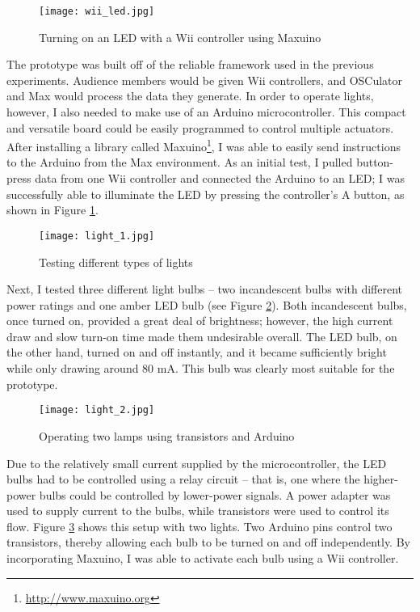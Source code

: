 \begin{figure}
	\centering

	\texttt{[image: wii\_led.jpg]}
	\caption{Turning on an LED with a Wii controller using Maxuino}

	\label{prototyping3.1}
\end{figure}

The prototype was built off of the reliable framework used in the previous experiments. Audience members would be given Wii controllers, and OSCulator and Max would process the data they generate. In order to operate lights, however, I also needed to make use of an Arduino microcontroller. This compact and versatile board could be easily programmed to control multiple actuators. After installing a library called Maxuino\footnote{\url{http://www.maxuino.org}}, I was able to easily send instructions to the Arduino from the Max environment. As an initial test, I pulled button-press data from one Wii controller and connected the Arduino to an LED; I was successfully able to illuminate the LED by pressing the controller's A button, as shown in Figure \ref{prototyping3.1}.

\begin{figure}
	\centering

	\texttt{[image: light\_1.jpg]}
	\caption{Testing different types of lights}

	\label{prototyping3.2}
\end{figure}

Next, I tested three different light bulbs -- two incandescent bulbs with different power ratings and one amber LED bulb (see Figure \ref{prototyping3.2}). Both incandescent bulbs, once turned on, provided a great deal of brightness; however, the high current draw and slow turn-on time made them undesirable overall. The LED bulb, on the other hand, turned on and off instantly, and it became sufficiently bright while only drawing around 80 mA. This bulb was clearly most suitable for the prototype.

\begin{figure}
	\centering

	\texttt{[image: light\_2.jpg]}
	\caption{Operating two lamps using transistors and Arduino}

	\label{prototyping3.3}
\end{figure}

Due to the relatively small current supplied by the microcontroller, the LED bulbs had to be controlled using a relay circuit -- that is, one where the higher-power bulbs could be controlled by lower-power signals. A power adapter was used to supply current to the bulbs, while transistors were used to control its flow. Figure \ref{prototyping3.3} shows this setup with two lights. Two Arduino pins control two transistors, thereby allowing each bulb to be turned on and off independently. By incorporating Maxuino, I was able to activate each bulb using a Wii controller.

